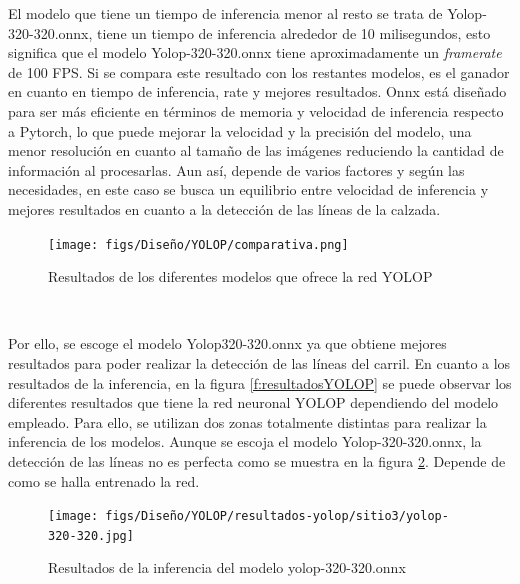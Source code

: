 El modelo que tiene un tiempo de inferencia menor al resto se trata de Yolop-320-320.onnx, tiene un tiempo de inferencia alrededor de 10 milisegundos, esto
significa que el modelo Yolop-320-320.onnx tiene aproximadamente un \textit{framerate} de 100 FPS. Si se compara este resultado con los restantes modelos, es el ganador en cuanto 
en tiempo de inferencia, rate y mejores resultados. 
Onnx está diseñado para ser más eficiente en términos de memoria y velocidad de inferencia respecto a Pytorch, lo que puede mejorar la velocidad y la precisión
del modelo, una menor resolución en cuanto al tamaño de las imágenes reduciendo la cantidad de información al procesarlas. Aun así, depende de varios factores y según las necesidades, 
en este caso se busca un equilibrio entre velocidad de inferencia y mejores resultados en cuanto a la detección de las líneas de la calzada. 

\begin{figure} [H]
  \begin{center}
    \texttt{[image: figs/Diseño/YOLOP/comparativa.png]}
  \end{center}
  \caption{Resultados de los diferentes modelos que ofrece la red YOLOP}
  \label{fig:resultados_pesos_preentrenados}
\end{figure}\

Por ello, se escoge el modelo Yolop320-320.onnx ya que obtiene mejores resultados para poder realizar la detección de las líneas del carril. 
En cuanto a los resultados de la inferencia, en la figura \ref{f:resultadosYOLOP} 
se puede observar los diferentes resultados que tiene la red neuronal YOLOP dependiendo del modelo empleado. Para ello, se utilizan dos zonas totalmente distintas para realizar 
la inferencia de los modelos. Aunque se escoja el modelo Yolop-320-320.onnx, la detección de las líneas no es perfecta como se muestra en la figura 
\ref{f:Inferencia320-320}. Depende de como se halla entrenado la red. 
\begin{figure} [H]
  \begin{center}
    \texttt{[image: figs/Diseño/YOLOP/resultados-yolop/sitio3/yolop-320-320.jpg]}
  \end{center}
  \caption{Resultados de la inferencia del modelo yolop-320-320.onnx}
  \label{f:Inferencia320-320}
\end{figure}\

